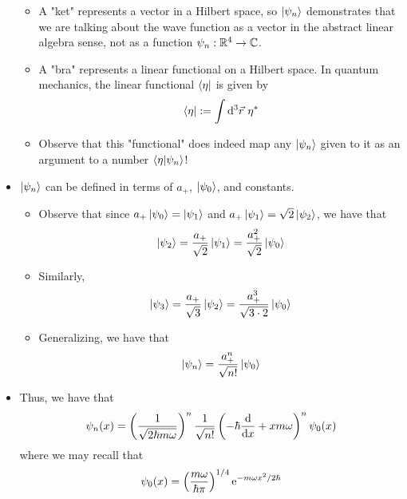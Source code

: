 \documentclass[../notes.tex]{subfiles}
\begin{document}
\begin{itemize}
    \begin{itemize}
        \item A "ket" represents a vector in a Hilbert space, so $\ket{\psi_n}$ demonstrates that we are talking about the wave function as a vector in the abstract linear algebra sense, not as a function $\psi_n:\mathbb{R}^4\to\mathbb{C}$.
        \item A "bra" represents a linear functional on a Hilbert space. In quantum mechanics, the linear functional $\bra{\eta}$ is given by
        \begin{equation*}
            \bra{\eta} := \int\dd^3\vec{r}\ \eta^*
        \end{equation*}
        \item Observe that this "functional" does indeed map any $\ket{\psi_n}$ given to it as an argument to a number $\braket{\eta}{\psi_n}$!
    \end{itemize}
    \item $\ket{\psi_n}$ can be defined in terms of $a_+$, $\ket{\psi_0}$, and constants.
    \begin{itemize}
        \item Observe that since $a_+\ket{\psi_0}=\ket{\psi_1}$ and $a_+\ket{\psi_1}=\sqrt{2}\ket{\psi_2}$, we have that
        \begin{equation*}
            \ket{\psi_2} = \frac{a_+}{\sqrt{2}}\ket{\psi_1}
            = \frac{a_+^2}{\sqrt{2}}\ket{\psi_0}
        \end{equation*}
        \item Similarly,
        \begin{equation*}
            \ket{\psi_3} = \frac{a_+}{\sqrt{3}}\ket{\psi_2}
            = \frac{a_+^3}{\sqrt{3\cdot 2}}\ket{\psi_0}
        \end{equation*}
        \item Generalizing, we have that
        \begin{equation*}
            \ket{\psi_n} = \frac{a_+^n}{\sqrt{n!}}\ket{\psi_0}
        \end{equation*}
    \end{itemize}
    \item Thus, we have that
    \begin{equation*}
        \psi_n(x) = \left( \frac{1}{\sqrt{2\hbar m\omega}} \right)^n\frac{1}{\sqrt{n!}}\left( -\hbar\dv{x}+xm\omega \right)^n\psi_0(x)
    \end{equation*}
    where we may recall that
    \begin{equation*}
        \psi_0(x) = \left( \frac{m\omega}{\hbar\pi} \right)^{1/4}\e[-m\omega x^2/2\hbar]

\end{equation*}
\end{itemize}
\end{document}
